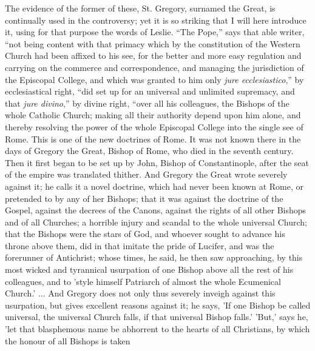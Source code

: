 The evidence of the former of these, St. Gregory, surnamed the
Great, is continually used in the controversy; yet it is so striking
that I will here introduce it, using for that purpose the words of
Leslie. ``The Pope,'' says that able writer, ``not being
content with that primacy which by the constitution of the Western
Church had been affixed to his see, for the better and more easy
regulation and carrying on the commerce and correspondence, and
managing the jurisdiction of the Episcopal College, and which was
granted to him only \emph{jure ecclesiastico},'' by ecclesiastical
right, ``did set up for an universal and unlimited supremacy, and
that \emph{jure divino},'' by divine right, ``over all his
colleagues, the Bishops of the whole Catholic Church; making all their
authority depend upon him alone, and thereby resolving the power of
the whole Episcopal College into the single see of Rome. This is one
of the new doctrines of Rome. It was not known there in the days of
Gregory the Great, Bishop of Rome, who died in the seventh century.
Then it first began to be set up by John, Bishop of Constantinople,
after the seat of the empire was translated thither. And Gregory the
Great wrote severely against it; he calls it a novel doctrine, which
had never been known at Rome, or pretended to by any of her Bishops;
that it was against the doctrine of the Gospel, against the decrees of
the Canons, against the rights of all other Bishops and of all
Churches; a horrible injury and scandal to the whole universal Church; that the Bishops were the stars of God, and whoever sought to
advance his throne above them, did in that imitate the pride of
Lucifer, and was the forerunner of Antichrist; whose times, he said,
he then saw approaching, by this most wicked and tyrannical usurpation
of one Bishop above all the rest of his colleagues, and to 'style
himself Patriarch of almost the whole Ecumenical Church.' ... And
Gregory does not only thus severely inveigh against this usurpation,
but gives excellent reasons against it; he says, 'If one Bishop be
called universal, the universal Church falls, if that universal Bishop
falls.' 'But,' says he, 'let that blasphemous name be abhorrent to the
hearts of all Christians, by which the honour of all Bishops is taken
